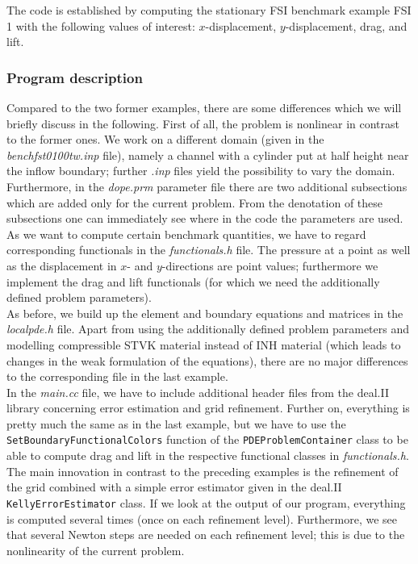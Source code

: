 The code is established by computing the stationary FSI benchmark example FSI 1 with 
the following values of interest: $x$-displacement, $y$-displacement, drag, and lift.   

\subsubsection{Program description}

Compared to the two former examples, there are some differences which we will briefly discuss in the following. First of all, the problem is nonlinear in contrast to the former ones. We work on a different domain (given in the \textit{benchfst0100tw.inp} file), namely a channel with a cylinder put at half height near the inflow boundary; further \textit{.inp} files yield the possibility to vary the domain.\\
Furthermore, in the \textit{dope.prm} parameter file there are two additional subsections which are added only for the current problem. From the denotation of these subsections one can immediately see where in the code the parameters are used.\\
As we want to compute certain benchmark quantities, we have to regard corresponding functionals in the \textit{functionals.h} file. The pressure at a point as well as the displacement in $x$- and $y$-directions are point values; furthermore we implement the drag and lift functionals (for which we need the additionally defined problem parameters).\\
As before, we build up the element and boundary equations and matrices in the \textit{localpde.h} file. Apart from using the additionally defined problem parameters and modelling compressible STVK material instead of INH material (which leads to changes in the weak formulation of the equations), there are no major differences to the corresponding file in the last example.\\
In the \textit{main.cc} file, we have to include additional header files from the deal.II library concerning error estimation and grid refinement. Further on, everything is pretty much the same as in the last example, but we have to use the \texttt{SetBoundaryFunctionalColors} function of the \texttt{PDEProblemContainer} class to be able to compute drag and lift in the respective functional classes in \textit{functionals.h}.\\
The main innovation in contrast to the preceding examples is the refinement of the grid combined with a simple error estimator given in the deal.II \texttt{KellyErrorEstimator} class. If we look at the output of our program, everything is computed several times (once on each refinement level). Furthermore, we see that several Newton steps are needed on each refinement level; this is due to the nonlinearity of the current problem.

